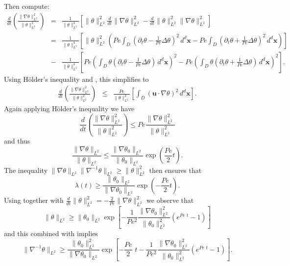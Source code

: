 \documentclass[12pt]{iopart}
\newcommand{\ddt}[1]{\frac{d #1}{dt}}
\newcommand{\hmone}[1]{\|\nabla^{-1} #1\|_{L^{2}}}
\newcommand{\ltwo}[1]{\|#1\|_{L^{2}}}
\newcommand{\hone}[1]{\| \nabla #1\|_{L^{2}}}
\newcommand{\sint}[1]{\int_{D} #1 \, d^{d}\mathbf{x}}
\renewcommand{\vec}[1]{\mathbf{#1}}
\newcommand{\ppt}[1]{\partial_{t} #1}
\newcommand{\lap}{\Delta }
\newcommand{\pbrac}[1]{\left( #1 \right)}
\newcommand{\sbrac}[1]{\left[ #1 \right]}
\begin{document}
Then compute:
%
\begin{eqnarray*}
	\ddt{} \pbrac{ \frac{\hone{\theta}^2}{\ltwo{\theta}^2} } 
			&=& \frac{1}{\ltwo{\theta}^4}
			\sbrac{
				\ltwo{\theta}^2\ddt{}\hone{\theta}^2
				-\ddt{}\ltwo{\theta}^2\hone{\theta}^2			
			}\\
			&=& \frac{1}{\ltwo{\theta}^4}
			\sbrac{
				\ltwo{\theta}^2
				\pbrac{
					Pe \sint{\left(\ppt{\theta}
	 									-\frac{1}{Pe}\lap \theta\right)^2} 
 					-Pe\sint{\left(\ppt{\theta}
	 									+\frac{1}{Pe}\lap \theta\right)^2} 
				}
			}\\
		&-&\frac{1}{\ltwo{\theta}^4}
			\sbrac{
				Pe
				\pbrac{
					 \sint{\theta\left(\ppt{\theta}
	 									-\frac{1}{Pe}\lap \theta\right)} 
 				}^2		
 				-
 				Pe
 				\pbrac{
					 \sint{\theta\left(\ppt{\theta}
	 									+\frac{1}{Pe}\lap \theta\right)} 
 				}^2					
			}.
\end{eqnarray*}
%
Using H\"older's inequality and , this simplifies to
%
\begin{eqnarray*}
	\ddt{} \pbrac{ \frac{\hone{\theta}^2}{\ltwo{\theta}^2} } 
			&\leq & \frac{Pe}{\ltwo{\theta}^2}
			\sbrac{
					 \sint{(\vec{u}\cdot \nabla \theta)^2} 
			}.
\end{eqnarray*}
Again applying H\"older's inequality we have
\begin{equation}
\label{eq:k2growth_energy}
	\ddt{} 
		\pbrac{ 
			\frac{\hone{\theta}^2}{\ltwo{\theta}^2} 
		} 
		\leq  
		Pe
		\frac{\hone{\theta}^2}{\ltwo{\theta}^2} 
\end{equation}
%
and thus 
%
\begin{equation}
		\frac{\hone{\theta}}{\ltwo{\theta}} 
		\leq  
		\frac{\hone{\theta_0}}{\ltwo{\theta_0}}
		\exp{\pbrac{\frac{Pe}{2} t}}.
\end{equation}
%
The inequality $\hone{\theta}\hmone{\theta}\geq \ltwo{\theta}^2$ then ensures that
%
\begin{equation}
\label{eq:lambda_bound}
\lambda(t) \geq \frac{\ltwo{\theta_0}}{\hone{\theta_0}}\exp{\pbrac{-\frac{Pe}{2}t}}.
\end{equation}
%
Using  together with  $\ddt{}\ltwo{\theta}^2 = -\frac{2}{Pe} \hone{\theta}^2$ we observe that
%
\begin{equation}
\ltwo{\theta}\geq \ltwo{\theta_{0}}\exp\left[-\frac{1}{Pe^2}\frac{\hone{\theta_0}^2}{\ltwo{\theta_0}^2}\left(e^{Pe \, \, t}-1\right)\right]
\end{equation}
%
and this combined with   implies
%
\begin{equation}
\hmone{\theta}\geq \frac{\ltwo{\theta_{0}}^2}{\hone{\theta_0}}\exp\left[-\frac{Pe}{2} \,\, t-\frac{1}{Pe^2}\frac{\hone{\theta_0}^2}{\ltwo{\theta_0}^2}\left(e^{Pe \,\, t}-1\right)\right].
\end{equation}
\end{document}
